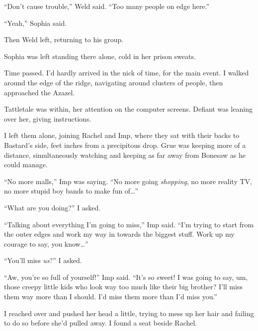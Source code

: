 ``Don't cause trouble,'' Weld said.  ``Too many people on edge here.''



``Yeah,'' Sophia said.



Then Weld left, returning to his group.



Sophia was left standing there alone, cold in her prison sweats.



Time passed.  I'd hardly arrived in the nick of time, for the main event.  I walked around the edge of the ridge, navigating around clusters of people, then approached the Azazel.



Tattletale was within, her attention on the computer screens.  Defiant was leaning over her, giving instructions.



I left them alone, joining Rachel and Imp, where they sat with their backs to Bastard's side, feet inches from a precipitous drop.  Grue was keeping more of a distance, simultaneously watching and keeping as far away from Bonesaw as he could manage.



``No more malls,'' Imp was saying.  ``No more going \emph{shopping}, no more reality TV, no more stupid boy bands to make fun of\ldots''



``What are you doing?'' I asked.



``Talking about everything I'm going to miss,'' Imp said.  ``I'm trying to start from the outer edges and work my way in towards the biggest stuff.  Work up my courage to say, you know\ldots''



``You'll miss \emph{us}?'' I asked.



``Aw, you're so full of yourself!''  Imp said.  ``It's so sweet!  I was going to say, um, those creepy little kids who look way too much like their big brother?  I'll miss them way more than I should.  I'd miss them more than I'd miss you.''



I reached over and pushed her head a little, trying to mess up her hair and failing to do so before she'd pulled away.  I found a seat beside Rachel.



